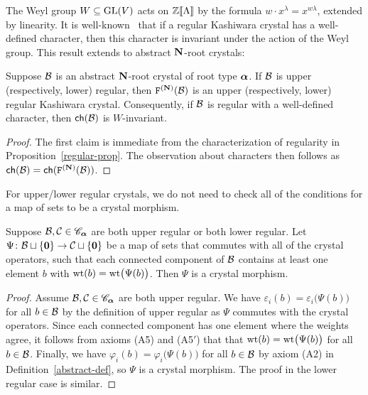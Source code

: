 \documentclass[11pt]{article}
\begin{document}
The Weyl group $W \subseteq \mathrm{GL}(V)$ acts on $ \mathbb{Z}\llbracket \Lambda\rrbracket $ by the formula $w \cdot x^{\lambda} = x^{w\lambda}$, extended by linearity.
It is well-known~\cite[Props.~2.36 and 2.37]{BumpSchilling} that if a regular Kashiwara crystal has a well-defined character, then this character is invariant under the action of the Weyl group.
This result extends to abstract $\mathbf{N}$-root crystals:


\begin{proposition}\label{sym-prop}
Suppose $\mathcal{B}$ is an abstract $\mathbf{N}$-root crystal of root type $\boldsymbol{\alpha}$.
If $\mathcal{B}$ is upper (respectively, lower) regular, 
then $\mathtt{F}^{(\mathbf{N})}(\mathcal{B})$ is an upper (respectively, lower) regular Kashiwara crystal.
Consequently, if $\mathcal{B}$ is regular with
 a well-defined character,
then $\mathsf{ch}(\mathcal{B})$ is $W$-invariant. 
\end{proposition}

\begin{proof}
The first claim is immediate from the characterization of regularity in Proposition~\ref{regular-prop}.
The observation about characters then follows as $\mathsf{ch}(\mathcal{B}) = \mathsf{ch}(\mathtt{F}^{(\mathbf{N})}(\mathcal{B}))$.
\end{proof}

For upper/lower regular crystals, we do not need to check all of the conditions for a map of sets to be a crystal morphism.

\begin{proposition}
\label{prop:morphism_by_ops}
Suppose $\mathcal{B}, \mathcal{C} \in \mathscr{C}_{\boldsymbol{\alpha}}$ are both upper regular or both lower regular.
Let $\Psi \colon \mathcal{B} \sqcup \{\boldsymbol{0}\} \to \mathcal{C} \sqcup \{\boldsymbol{0}\}$ be a map of sets that commutes with all of the crystal operators, such that each connected component of $\mathcal{B}$ contains at least one element $b$  with $\operatorname{wt}(b) = \operatorname{wt}\bigl(\Psi(b)\bigr)$.
Then $\Psi$ is a crystal morphism.
\end{proposition}

\begin{proof}
Assume $\mathcal{B}, \mathcal{C} \in \mathscr{C}_{\boldsymbol{\alpha}}$ are both upper regular.
We have $\varepsilon_i(b) = \varepsilon_i\bigl(\Psi(b)\bigr)$ for all $b \in \mathcal{B}$ by  the definition of upper regular as $\Psi$ commutes with the crystal operators.
Since each connected component has one element where the weights agree, 
it follows 
from axioms (A5) and (A5$'$) that
 that $\operatorname{wt}(b) = \operatorname{wt}\bigl(\Psi(b)\bigr)$ for all $b \in \mathcal{B}$.
Finally, we have $\varphi_i(b) = \varphi_i\bigl(\Psi(b)\bigr)$ for all $b \in \mathcal{B}$ by axiom (A2) in Definition~\ref{abstract-def}, so $\Psi$ is a crystal morphism.
%
The proof in the lower regular case is similar.
\end{proof}
\end{document}
